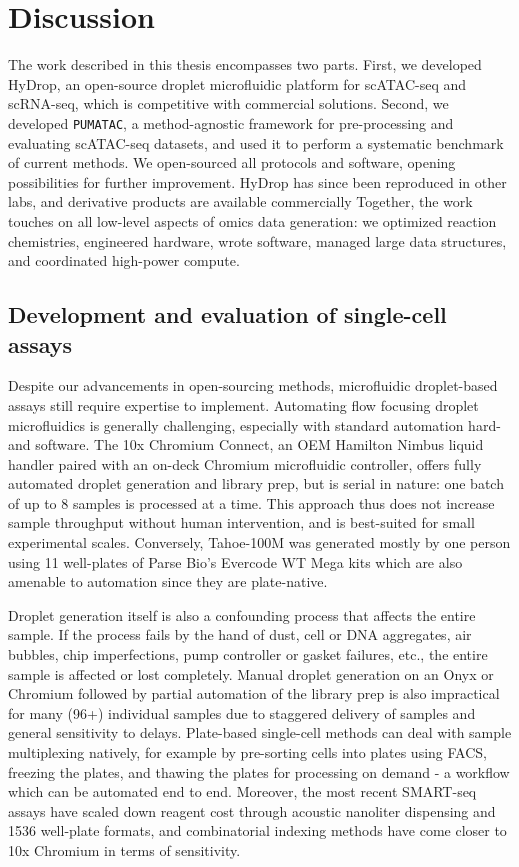 \chapter{Discussion}

The work described in this thesis encompasses two parts. First, we developed HyDrop, an open-source droplet microfluidic platform for scATAC-seq and scRNA-seq, which is competitive with commercial solutions. Second, we developed \verb|PUMATAC|, a method-agnostic framework for pre-processing and evaluating scATAC-seq datasets, and used it to perform a systematic benchmark of current methods. We open-sourced all protocols and software, opening possibilities for further improvement. HyDrop has since been reproduced in other labs, and derivative products are available commercially Together, the work touches on all low-level aspects of omics data generation: we optimized reaction chemistries, engineered hardware, wrote software, managed large data structures, and coordinated high-power compute.

\section{Development and evaluation of single-cell assays}
\label{sec:assays}

Despite our advancements in open-sourcing methods, microfluidic droplet-based assays still require expertise to implement. Automating flow focusing droplet microfluidics is generally challenging, especially with standard automation hard- and software. The 10x Chromium Connect, an OEM Hamilton Nimbus liquid handler paired with an on-deck Chromium microfluidic controller, offers fully automated droplet generation and library prep, but is serial in nature: one batch of up to 8 samples is processed at a time. This approach thus does not increase sample throughput without human intervention, and is best-suited for small experimental scales. Conversely, Tahoe-100M was generated mostly by one person using 11 well-plates of Parse Bio's Evercode WT Mega kits which are also amenable to automation since they are plate-native.

Droplet generation itself is also a confounding process that affects the entire sample. If the process fails by the hand of dust, cell or DNA aggregates, air bubbles, chip imperfections, pump controller or gasket failures, etc., the entire sample is affected or lost completely. Manual droplet generation on an Onyx or Chromium followed by partial automation of the library prep is also impractical for many (96+) individual samples due to staggered delivery of samples and general sensitivity to delays. Plate-based single-cell methods can deal with sample multiplexing natively, for example by pre-sorting cells into plates using FACS, freezing the plates, and thawing the plates for processing on demand - a workflow which can be automated end to end. Moreover, the most recent SMART-seq assays have scaled down reagent cost through acoustic nanoliter dispensing and \num{1536} well-plate formats, and combinatorial indexing methods have come closer to 10x Chromium in terms of sensitivity.

